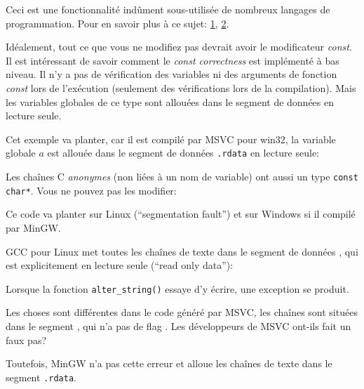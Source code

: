 \label{const_in_rdata}

Ceci est une fonctionnalité indûment sous-utilisée de nombreux langages de programmation.
Pour en savoir plus à ce sujet:
\href{https://isocpp.org/wiki/faq/const-correctness}{1},
\href{https://stackoverflow.com/questions/136880/sell-me-on-const-correctness}{2}.

Idéalement, tout ce que vous ne modifiez pas devrait avoir le modificateur \emph{const}.
Il est intéressant de savoir comment le \emph{const correctness} est implémenté
à bas niveau.
Il n'y a pas de vérification des variables ni des arguments de fonction  \emph{const}
lors de l'exécution (seulement des vérifications lors de la compilation).
Mais les variables globales de ce type sont allouées dans le segment de données en
lecture seule.

Cet exemple va planter, car il est compilé par MSVC pour win32, la variable globale
$a$ est allouée dans le segment de données \verb|.rdata| en lecture seule:



Les chaînes C \emph{anonymes} (non liées à un nom de variable) ont aussi un type
\verb|const char*|.
Vous ne pouvez pas les modifier:



Ce code va planter sur Linux (``segmentation fault'') et sur Windows si il compilé
par MinGW.

GCC pour Linux met toutes les chaînes de texte dans le segment de données ,
qui est explicitement en lecture seule (``read only data''):



Lorsque la fonction \verb|alter_string()| essaye d'y écrire, une exception se produit.

Les choses sont différentes dans le code généré par MSVC, les chaînes sont situées
dans le segment , qui n'a pas de flag .
Les développeurs de MSVC ont-ils fait un faux pas?



Toutefois, MinGW n'a pas cette erreur et alloue les chaînes de texte dans le segment
\verb|.rdata|.



